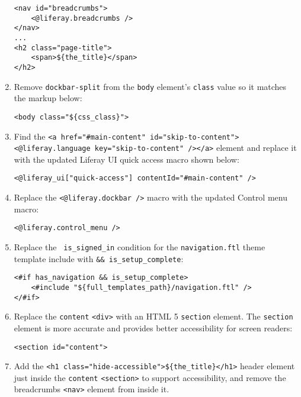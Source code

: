 \begin{enumerate}
\begin{verbatim}
<nav id="breadcrumbs">      
    <@liferay.breadcrumbs />        
</nav>
...
<h2 class="page-title">
    <span>${the_title}</span>
</h2>
\end{verbatim}
\item
  Remove \texttt{dockbar-split} from the \texttt{body} element's
  \texttt{class} value so it matches the markup below:

\begin{verbatim}
<body class="${css_class}">
\end{verbatim}
\item
  Find the
  \texttt{\textless{}a\ href="\#main-content"\ id="skip-to-content"\textgreater{}\textless{}@liferay.language\ key="skip-to-content"\ /\textgreater{}\textless{}/a\textgreater{}}
  element and replace it with the updated Liferay UI quick access macro
  shown below:

\begin{verbatim}
<@liferay_ui["quick-access"] contentId="#main-content" />
\end{verbatim}
\item
  Replace the \texttt{\textless{}@liferay.dockbar\ /\textgreater{}}
  macro with the updated Control menu macro:

\begin{verbatim}
<@liferay.control_menu />
\end{verbatim}
\item
  Replace the \texttt{\textbar{}\textbar{}\ is\_signed\_in} condition
  for the \texttt{navigation.ftl} theme template include with
  \texttt{\&\&\ is\_setup\_complete}:

\begin{verbatim}
<#if has_navigation && is_setup_complete>
    <#include "${full_templates_path}/navigation.ftl" />
</#if>
\end{verbatim}
\item
  Replace the \texttt{content} \texttt{\textless{}div\textgreater{}}
  with an HTML 5 \texttt{section} element. The \texttt{section} element
  is more accurate and provides better accessibility for screen readers:

\begin{verbatim}
<section id="content">
\end{verbatim}
\item
  Add the
  \texttt{\textless{}h1\ class="hide-accessible"\textgreater{}\$\{the\_title\}\textless{}/h1\textgreater{}}
  header element just inside the \texttt{content}
  \texttt{\textless{}section\textgreater{}} to support accessibility,
  and remove the breadcrumbs \texttt{\textless{}nav\textgreater{}}
  element from inside it.
\end{enumerate}

